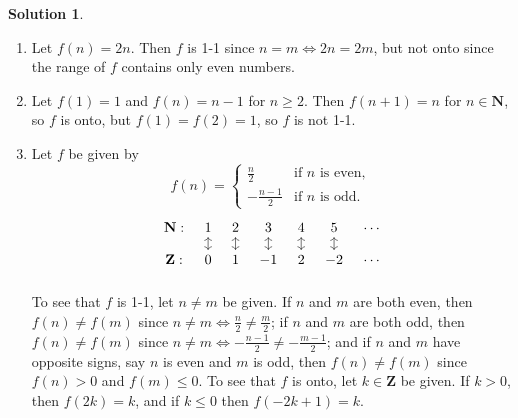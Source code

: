 \documentclass[12pt]{article}
\theoremstyle{definition}
\theoremstyle{exercise}
\theoremstyle{solution}
\newtheorem*{solution}{Solution}
\begin{document}
\begin{solution}
    \begin{enumerate}[label = (\alph*)]
        \item Let \( f(n) = 2n \). Then \( f \) is 1-1 since \( n = m \iff 2n = 2m \), but not onto since the range of \( f \) contains only even numbers.

        \item Let \( f(1) = 1 \) and \( f(n) = n - 1 \) for \( n \geq 2 \). Then \( f(n + 1) = n \) for \( n \in \mathbf{N} \), so \( f \) is onto, but \( f(1) = f(2) = 1 \), so \( f \) is not 1-1.

        \item Let \( f \) be given by
        \[
            f(n) = \begin{cases}
                \frac{n}{2} & \text{if } n \text{ is even}, \\
                -\frac{n-1}{2} & \text{if } n \text{ is odd}.
            \end{cases}
        \]
        \[
            \begin{tikzcd}[column sep = tiny, row sep = small]
                \mathbf{N} : & 1 \arrow[d, leftrightarrow] & 2 \arrow[d, leftrightarrow] & 3 \arrow[d, leftrightarrow] & 4 \arrow[d, leftrightarrow] & 5 \arrow[d, leftrightarrow] & \cdots \\
                \mathbf{Z} : & 0 & 1 & -1 & 2 & -2 & \cdots \\
            \end{tikzcd}
        \]
        To see that \( f \) is 1-1, let \( n \neq m \) be given. If \( n \) and \( m \) are both even, then \( f(n) \neq f(m) \) since \( n \neq m \iff \tfrac{n}{2} \neq \tfrac{m}{2} \); if \( n \) and \( m \) are both odd, then \( f(n) \neq f(m) \) since \( n \neq m \iff -\tfrac{n-1}{2} \neq -\tfrac{m-1}{2} \); and if \( n \) and \( m \) have opposite signs, say \( n \) is even and \( m \) is odd, then \( f(n) \neq f(m) \) since \( f(n) > 0 \) and \( f(m) \leq 0 \). To see that \( f \) is onto, let \( k \in \mathbf{Z} \) be given. If \( k > 0 \), then \( f(2k) = k \), and if \( k \leq 0 \) then \( f(-2k + 1) = k \).
    \end{enumerate}
\end{solution}
\end{document}
